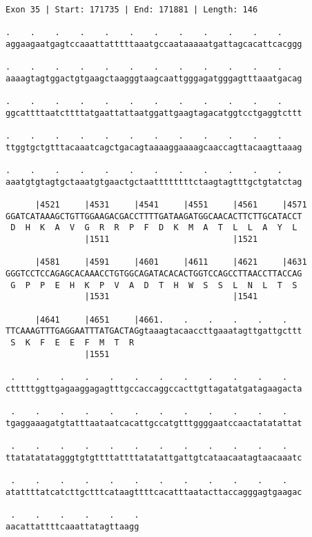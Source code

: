 \documentclass{article}
\begin{document}
\newpage
\begin{Verbatim}
Exon 35 | Start: 171735 | End: 171881 | Length: 146
 
.    .    .    .    .    .    .    .    .    .    .    .    
aggaagaatgagtccaaattatttttaaatgccaataaaaatgattagcacattcacggg
  
.    .    .    .    .    .    .    .    .    .    .    .    
aaaagtagtggactgtgaagctaagggtaagcaattgggagatgggagtttaaatgacag
  
.    .    .    .    .    .    .    .    .    .    .    .    
ggcattttaatcttttatgaattattaatggattgaagtagacatggtcctgaggtcttt
  
.    .    .    .    .    .    .    .    .    .    .    .    
ttggtgctgtttacaaatcagctgacagtaaaaggaaaagcaaccagttacaagttaaag
  
.    .    .    .    .    .    .    .    .    .    .    .    
aaatgtgtagtgctaaatgtgaactgctaattttttttctaagtagtttgctgtatctag
  
      |4521     |4531     |4541     |4551     |4561     |4571
GGATCATAAAGCTGTTGGAAGACGACCTTTTGATAAGATGGCAACACTTCTTGCATACCT
 D  H  K  A  V  G  R  R  P  F  D  K  M  A  T  L  L  A  Y  L 
                |1511                         |1521         
  
      |4581     |4591     |4601     |4611     |4621     |4631
GGGTCCTCCAGAGCACAAACCTGTGGCAGATACACACTGGTCCAGCCTTAACCTTACCAG
 G  P  P  E  H  K  P  V  A  D  T  H  W  S  S  L  N  L  T  S 
                |1531                         |1541         
  
      |4641     |4651     |4661.    .    .    .    .    .   
TTCAAAGTTTGAGGAATTTATGACTAGgtaaagtacaaccttgaaatagttgattgcttt
 S  K  F  E  E  F  M  T  R                                  
                |1551                                       
  
 .    .    .    .    .    .    .    .    .    .    .    .   
ctttttggttgagaaggagagtttgccaccaggccacttgttagatatgatagaagacta
  
 .    .    .    .    .    .    .    .    .    .    .    .   
tgaggaaagatgtatttaataatcacattgccatgtttggggaatccaactatatattat
  
 .    .    .    .    .    .    .    .    .    .    .    .   
ttatatatatagggtgtgttttattttatatattgattgtcataacaatagtaacaaatc
  
 .    .    .    .    .    .    .    .    .    .    .    .   
atattttatcatcttgctttcataagttttcacatttaatacttaccagggagtgaagac
  
 .    .    .    .    .    .
aacattattttcaaattatagttaagg
\end{Verbatim}
\end{document}
